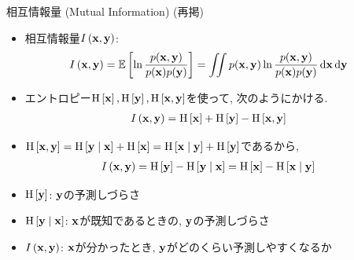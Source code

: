\documentclass[dvipdfmx,notheorems,t]{beamer}
\begin{document}
\begin{frame}{相互情報量 (Mutual Information) (再掲)}
\begin{itemize}
  \item 相互情報量$I \left( \vb{x}, \vb{y} \right)$:
  \begin{align*}
    I \left( \vb{x}, \vb{y} \right) &= \operatorname{\mathbb{E}} \left[ \ln \frac{p(\vb{x}, \vb{y})}{p(\vb{x}) p(\vb{y})} \right]
      = \iint p(\vb{x}, \vb{y}) \ln \frac{p(\vb{x}, \vb{y})}{p(\vb{x}) p(\vb{y})} \dd{\vb{x}} \dd{\vb{y}}
  \end{align*}
  \item エントロピー$\operatorname{H} \left[ \vb{x} \right], \operatorname{H} \left[ \vb{y} \right], \operatorname{H} \left[ \vb{x}, \vb{y} \right]$を使って, 次のようにかける.
  \begin{align*}
    I \left( \vb{x}, \vb{y} \right) &= \operatorname{H} \left[ \vb{x} \right] + \operatorname{H} \left[ \vb{y} \right] - \operatorname{H} \left[ \vb{x}, \vb{y} \right]
  \end{align*}
  \item $\operatorname{H} \left[ \vb{x}, \vb{y} \right] = \operatorname{H} \left[ \vb{y} \mid \vb{x} \right] + \operatorname{H} \left[ \vb{x} \right]
  = \operatorname{H} \left[ \vb{x} \mid \vb{y} \right] + \operatorname{H} \left[ \vb{y} \right]$であるから,
  \begin{align*}
    I \left( \vb{x}, \vb{y} \right) &= \operatorname{H} \left[ \vb{y} \right] - \operatorname{H} \left[ \vb{y} \mid \vb{x} \right]
      = \operatorname{H} \left[ \vb{x} \right] - \operatorname{H} \left[ \vb{x} \mid \vb{y} \right]
  \end{align*}
  \item $\operatorname{H} \left[ \vb{y} \right]$: $\vb{y}$の予測しづらさ
  \item $\operatorname{H} \left[ \vb{y} \mid \vb{x} \right]$: $\vb{x}$が既知であるときの, $\vb{y}$の予測しづらさ
  \item $I \left( \vb{x}, \vb{y} \right)$: $\vb{x}$が分かったとき, $\vb{y}$がどのくらい予測しやすくなるか
\end{itemize}
\end{frame}
\end{document}
